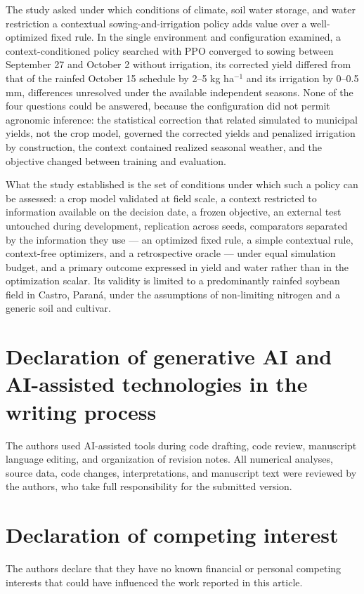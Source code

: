 \documentclass[times,final,authoryear]{elsarticle}
\begin{document}
The study asked under which conditions of climate, soil water storage, and water restriction a contextual sowing-and-irrigation policy adds value over a well-optimized fixed rule. In the single environment and configuration examined, a context-conditioned policy searched with PPO converged to sowing between September 27 and October 2 without irrigation, its corrected yield differed from that of the rainfed October 15 schedule by 2--5 kg ha$^{-1}$ and its irrigation by 0--0.5 mm, differences unresolved under the available independent seasons. None of the four questions could be answered, because the configuration did not permit agronomic inference: the statistical correction that related simulated to municipal yields, not the crop model, governed the corrected yields and penalized irrigation by construction, the context contained realized seasonal weather, and the objective changed between training and evaluation.

What the study established is the set of conditions under which such a policy can be assessed: a crop model validated at field scale, a context restricted to information available on the decision date, a frozen objective, an external test untouched during development, replication across seeds, comparators separated by the information they use --- an optimized fixed rule, a simple contextual rule, context-free optimizers, and a retrospective oracle --- under equal simulation budget, and a primary outcome expressed in yield and water rather than in the optimization scalar. Its validity is limited to a predominantly rainfed soybean field in Castro, Paraná, under the assumptions of non-limiting nitrogen and a generic soil and cultivar.



\section*{Declaration of generative AI and AI-assisted technologies in the writing process}

The authors used AI-assisted tools during code drafting, code review, manuscript language editing, and organization of revision notes. All numerical analyses, source data, code changes, interpretations, and manuscript text were reviewed by the authors, who take full responsibility for the submitted version.

\section*{Declaration of competing interest}
The authors declare that they have no known financial or personal competing interests that could have influenced the work reported in this article.
\end{document}

